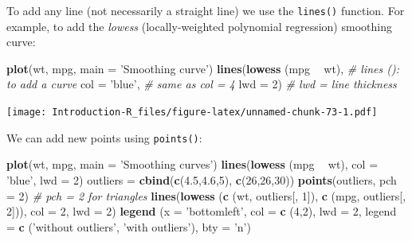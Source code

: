 \documentclass[]{book}
\newenvironment{Shaded}{\begin{snugshade}}{\end{snugshade}}
\newcommand{\CommentTok}[1]{\textcolor[rgb]{0.56,0.35,0.01}{\textit{#1}}}
\newcommand{\DataTypeTok}[1]{\textcolor[rgb]{0.13,0.29,0.53}{#1}}
\newcommand{\DecValTok}[1]{\textcolor[rgb]{0.00,0.00,0.81}{#1}}
\newcommand{\FloatTok}[1]{\textcolor[rgb]{0.00,0.00,0.81}{#1}}
\newcommand{\KeywordTok}[1]{\textcolor[rgb]{0.13,0.29,0.53}{\textbf{#1}}}
\newcommand{\NormalTok}[1]{#1}
\newcommand{\OperatorTok}[1]{\textcolor[rgb]{0.81,0.36,0.00}{\textbf{#1}}}
\newcommand{\StringTok}[1]{\textcolor[rgb]{0.31,0.60,0.02}{#1}}
\begin{document}
To add any line (not necessarily a straight line) we use the \texttt{lines()} function. For example, to add the \emph{lowess} (locally-weighted polynomial regression) smoothing curve:

\begin{Shaded}
\begin{Highlighting}[]
\KeywordTok{plot}\NormalTok{(wt, mpg, }\DataTypeTok{main =} \StringTok{'Smoothing curve'}\NormalTok{)}
\KeywordTok{lines}\NormalTok{(}\KeywordTok{lowess}\NormalTok{ (mpg }\OperatorTok{~}\StringTok{ }\NormalTok{wt), }\CommentTok{# lines (): to add a curve}
      \DataTypeTok{col =} \StringTok{'blue'}\NormalTok{, }\CommentTok{# same as col = 4}
      \DataTypeTok{lwd =} \DecValTok{2}\NormalTok{) }\CommentTok{# lwd = line thickness}
\end{Highlighting}
\end{Shaded}

\texttt{[image: Introduction-R\_files/figure-latex/unnamed-chunk-73-1.pdf]}

We can add new points using \texttt{points()}:

\begin{Shaded}
\begin{Highlighting}[]
\KeywordTok{plot}\NormalTok{(wt, mpg, }\DataTypeTok{main =} \StringTok{'Smoothing curves'}\NormalTok{)}
\KeywordTok{lines}\NormalTok{(}\KeywordTok{lowess}\NormalTok{ (mpg }\OperatorTok{~}\StringTok{ }\NormalTok{wt), }\DataTypeTok{col =} \StringTok{'blue'}\NormalTok{, }\DataTypeTok{lwd =} \DecValTok{2}\NormalTok{)}
\NormalTok{outliers =}\StringTok{ }\KeywordTok{cbind}\NormalTok{(}\KeywordTok{c}\NormalTok{(}\FloatTok{4.5}\NormalTok{,}\FloatTok{4.6}\NormalTok{,}\DecValTok{5}\NormalTok{), }\KeywordTok{c}\NormalTok{(}\DecValTok{26}\NormalTok{,}\DecValTok{26}\NormalTok{,}\DecValTok{30}\NormalTok{))}
\KeywordTok{points}\NormalTok{(outliers, }\DataTypeTok{pch =} \DecValTok{2}\NormalTok{) }\CommentTok{# pch = 2 for triangles}
\KeywordTok{lines}\NormalTok{(}\KeywordTok{lowess}\NormalTok{ (}\KeywordTok{c}\NormalTok{ (wt, outliers[, }\DecValTok{1}\NormalTok{]),}
              \KeywordTok{c}\NormalTok{ (mpg, outliers[, }\DecValTok{2}\NormalTok{])),}
      \DataTypeTok{col =} \DecValTok{2}\NormalTok{, }\DataTypeTok{lwd =} \DecValTok{2}\NormalTok{)}
\KeywordTok{legend}\NormalTok{ (}\DataTypeTok{x =} \StringTok{'bottomleft'}\NormalTok{, }\DataTypeTok{col =} \KeywordTok{c}\NormalTok{ (}\DecValTok{4}\NormalTok{,}\DecValTok{2}\NormalTok{), }\DataTypeTok{lwd =} \DecValTok{2}\NormalTok{, }\DataTypeTok{legend =} \KeywordTok{c}\NormalTok{ (}\StringTok{'without outliers'}\NormalTok{, }\StringTok{'with outliers'}\NormalTok{), }\DataTypeTok{bty =} \StringTok{'n'}\NormalTok{)}
\end{Highlighting}
\end{Shaded}
\end{document}
